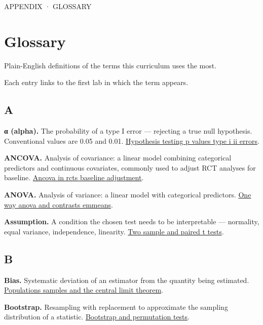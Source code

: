 \documentclass[
]{article}
\author{}
\date{\vspace{-2.5em}}
\begin{document}
{
\setcounter{tocdepth}{3}
\tableofcontents
}
APPENDIX · GLOSSARY

\section{Glossary}\label{glossary}

Plain-English definitions of the terms this curriculum uses the most.

Each entry links to the first lab in which the term appears.

\subsection{A}\label{a}

\textbf{α (alpha).} The probability of a type I error --- rejecting a
true null hypothesis. Conventional values are 0.05 and 0.01.
\href{../chapters/04-inferential/labs/lab-hypothesis-testing-p-values-type-i-ii-errors.Rmd}{Hypothesis
testing p values type i ii errors}.

\textbf{ANCOVA.} Analysis of covariance: a linear model combining
categorical predictors and continuous covariates, commonly used to
adjust RCT analyses for baseline.
\href{../chapters/07-regression/labs/lab-ancova-in-rcts-baseline-adjustment.Rmd}{Ancova
in rcts baseline adjustment}.

\textbf{ANOVA.} Analysis of variance: a linear model with categorical
predictors.
\href{../chapters/07-regression/labs/lab-one-way-anova-and-contrasts-emmeans.Rmd}{One
way anova and contrasts emmeans}.

\textbf{Assumption.} A condition the chosen test needs to be
interpretable --- normality, equal variance, independence, linearity.
\href{../chapters/04-inferential/labs/lab-two-sample-and-paired-t-tests.Rmd}{Two
sample and paired t tests}.

\subsection{B}\label{b}

\textbf{Bias.} Systematic deviation of an estimator from the quantity
being estimated.
\href{../chapters/04-inferential/labs/lab-populations-samples-and-the-central-limit-theorem.Rmd}{Populations
samples and the central limit theorem}.

\textbf{Bootstrap.} Resampling with replacement to approximate the
sampling distribution of a statistic.
\href{../chapters/04-inferential/labs/lab-bootstrap-and-permutation-tests.Rmd}{Bootstrap
and permutation tests}.
\end{document}
